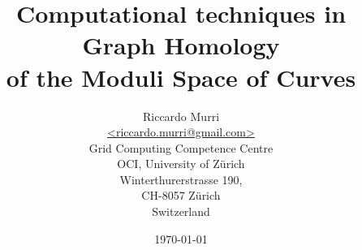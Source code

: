 

\title{%
  Computational techniques in Graph Homology \\
  of the Moduli Space of Curves
}
\date{\today}
\author{
  Riccardo Murri 
  \\ 
  \url{<riccardo.murri@gmail.com>} 
  \\
  Grid Computing Competence Centre \\
  OCI, University of Z\"urich \\
  Winterthurerstrasse 190, \\
  CH-8057 Z\"urich \\
  Switzerland
}

\maketitle

\setcounter{tocdepth}{2} %

\tableofcontents

